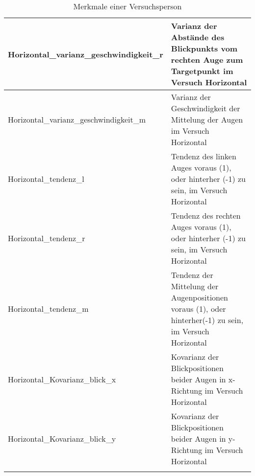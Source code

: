 \begin{longtable}{|p{7cm}|p{7.4cm}|}
	Horizontal\_varianz\_geschwindigkeit\_r &
	Varianz der Abst\"ande des Blickpunkts vom rechten Auge zum Targetpunkt im Versuch Horizontal\\ \hline
	Horizontal\_varianz\_geschwindigkeit\_m &
	Varianz der Geschwindigkeit der Mittelung der Augen im Versuch Horizontal\\ \hline
	Horizontal\_tendenz\_l &
	Tendenz des linken Auges voraus (1), oder hinterher (-1) zu sein, im Versuch Horizontal\\ \hline
	Horizontal\_tendenz\_r &
	Tendenz des rechten Auges voraus (1), oder hinterher (-1) zu sein, im Versuch Horizontal\\ \hline
	Horizontal\_tendenz\_m &
	Tendenz der Mittelung der Augenpositionen voraus (1), oder hinterher(-1) zu sein, im Versuch Horizontal\\ \hline
	Horizontal\_Kovarianz\_blick\_x &
	Kovarianz der Blickpositionen beider Augen in x-Richtung im Versuch Horizontal\\ \hline
	Horizontal\_Kovarianz\_blick\_y &
	Kovarianz der Blickpositionen beider Augen in y-Richtung im Versuch Horizontal\\ \hline
	
	\caption{\label{tab:MerkmaleVP}Merkmale einer Versuchsperson}
	
\end{longtable}

